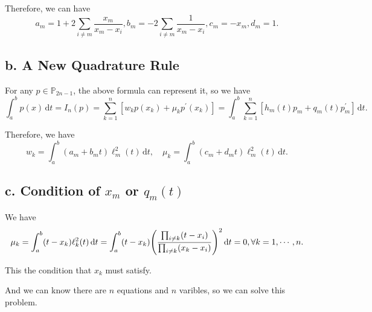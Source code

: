 \documentclass[a4paper]{article}
\begin{document}
Therefore, we can have 
\begin{equation}
    a_m = 1 + 2\sum_{i \ne m} \frac{x_m}{x_m - x_i} , b_m = -2\sum_{i \ne m} \frac{1}{x_m - x_i}, c_m = -x_m, d_m = 1.
\end{equation}

\subsection*{b. A New Quadrature Rule}

For any $p \in \mathbb{P}_{2n-1}$, the above formula can represent it, so we have 
\begin{equation}
    \int_{a}^{b} p(x)\,\mathrm{d}t = I_n (p) =  \sum_{k=1}^{n} [w_k p(x_k) + \mu_k p^{\prime}(x_k)] = \int_{a}^{b} \sum_{k=1}^{n}[h_m(t) p_m + q_m(t) p_{m}^{\prime}]  \,\mathrm{d}t.
\end{equation}

Therefore, we have 
\begin{equation}
    w_k = \int_{a}^{b} (a_m + b_m t) \ell_m^2(t) \,\mathrm{d}t, \quad \mu_k = \int_{a}^{b} (c_m + d_m t) \ell_m^2(t) \,\mathrm{d}t.
\end{equation}

\subsection*{c. Condition of $x_m$ or $q_m(t)$}

We have 
\begin{equation}
    \mu_k = \int_{a}^{b} (t - x_k) \ell_k^2(t) \,\mathrm{d}t = \int_{a}^{b} (t - x_k) \qty(\frac{\prod_{i \ne k} (t - x_i)}{\prod_{i \ne k} (x_k - x_i)})^2 \,\mathrm{d}t = 0, \forall k=1, \cdots, n.
\end{equation}

This the condition that $x_k$ must satisfy.

And we can know there are $n$ equations and $n$ varibles, so we can solve this problem.
\end{document}
